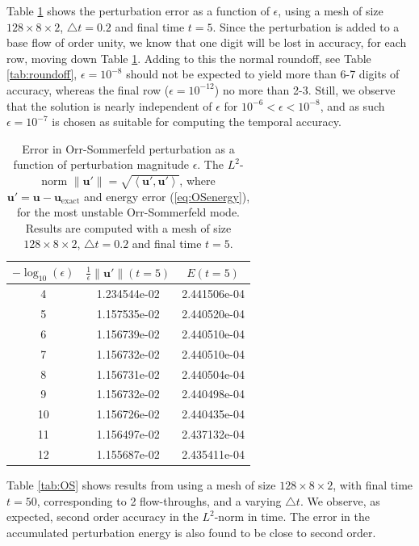 \documentclass[11pt, oneside]{elsarticle}
\begin{document}
Table \ref{tab:epsilon} shows the perturbation error as a function of $\epsilon$, using a mesh of size $128 \times 8 \times 2$, $\triangle t=0.2$ and final time $t=5$. Since the perturbation is added to a base flow of order unity, we know that one digit will be lost in accuracy, for each row, moving down Table \ref{tab:epsilon}. Adding to this the normal roundoff, see Table \ref{tab:roundoff}, $\epsilon=10^{-8}$ should not be expected to yield more than 6-7 digits of accuracy, whereas the final row ($\epsilon=10^{-12}$) no more than 2-3. Still, we observe that the solution is nearly independent of $\epsilon$ for $10^{-6} < \epsilon < 10^{-8}$, and as such $\epsilon=10^{-7}$ is chosen as suitable for computing the temporal accuracy.
\begin{table}
	\centering
	\caption{ Error in Orr-Sommerfeld perturbation as a function of perturbation magnitude $\epsilon$. The $L^2$-norm $ \| \bm{u}' \| = \sqrt{\left< \bm{u}', \bm{u}'\right>}$, where $\bm{u}'=\bm{u}-\bm{u}_{\mathrm{exact}}$ and energy error (\ref{eq:OSenergy}), for the most unstable Orr-Sommerfeld mode. Results are computed with a mesh of size $128 \times 8 \times 2$, $\triangle t=0.2$ and final time $t=5$. \label{tab:epsilon}}
	\begin{tabular}{ccc}	
		$-\log_{10}(\epsilon)$ & $\frac{1}{\epsilon}\| \bm{u}' \|(t=5)$ & $E(t=5)$ \\
		\hline
		4 & 1.234544e-02 & 2.441506e-04 \\ 
		5 & 1.157535e-02 & 2.440520e-04 \\ 
		6 & 1.156739e-02 & 2.440510e-04 \\ 
		7 & 1.156732e-02 & 2.440510e-04 \\ 
		8 & 1.156731e-02 & 2.440504e-04 \\ 
		9 & 1.156732e-02 & 2.440498e-04 \\ 
		10 & 1.156726e-02 & 2.440435e-04 \\ 
		11 & 1.156497e-02 & 2.437132e-04 \\ 
		12 & 1.155687e-02 & 2.435411e-04
	\end{tabular}
\end{table}

Table \ref{tab:OS} shows results from using a mesh of size $128 \times 8 \times 2$, with final time $t=50$, corresponding to 2 flow-throughs, and a varying $\triangle t$. We observe, as expected, second order accuracy in the $L^2$-norm in time. The error in the accumulated perturbation energy is also found to be close to second order.
\end{document}
